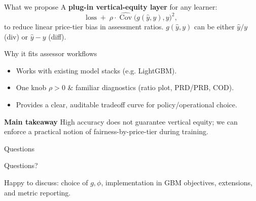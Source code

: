 \documentclass[aspectratio=169,10pt]{beamer}
\newcommand{\Cov}{\operatorname{Cov}}
\newcommand{\yh}{\hat y}
\begin{document}
\section{\sectionF}
\begin{frame}{\sectionF}
\vspace{-2mm}
\begin{block}{ What we propose}
A \textbf{plug-in vertical-equity layer} for any learner:
\[
\text{loss} \;+\; \rho\cdot \widehat{\Cov}\big(g(\yh,y),y\big)^2,
\]
to reduce linear price-tier bias in assessment ratios. $g(\hat{y},y)$ can be either $\hat{y}/y$ (div) or $\hat{y}-y$ (diff). 
\end{block}

\begin{block}{ Why it fits assessor workflows}
\begin{itemize}
  \item Works with existing model stacks (e.g. LightGBM).
  \item One knob \(\rho>0\) \& familiar diagnostics (ratio plot, PRD/PRB, COD).
  \item Provides a clear, auditable tradeoff curve for policy/operational choice.
\end{itemize}
\end{block}

\begin{block}{ \textbf{Main takeaway}}
High accuracy does not guarantee vertical equity; we can enforce a practical notion of fairness-by-price-tier during training.
\end{block}
\end{frame}

\begin{frame}{Questions}
\begin{center}
\Large Questions?
\end{center}

\vspace{2mm}
\begin{center}
\footnotesize Happy to discuss: choice of \(g,\phi\), implementation in GBM objectives, extensions, and metric reporting.
\end{center}
\end{frame}




\end{document}
